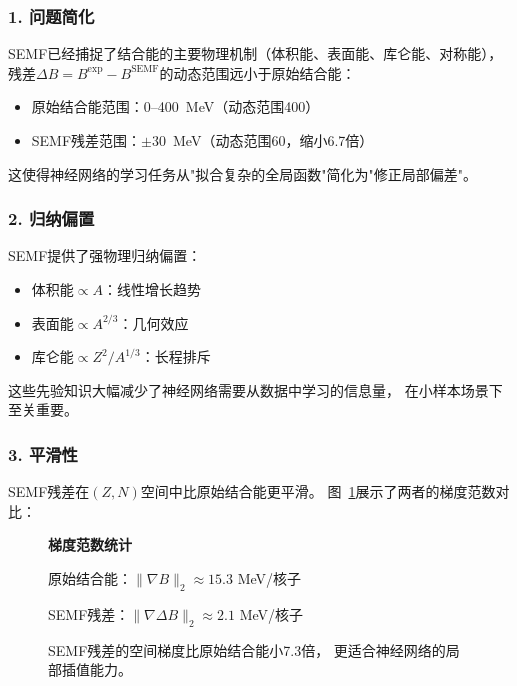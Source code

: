 \documentclass[12pt, a4paper]{article}
\begin{document}
\subsubsection{1. 问题简化}

SEMF已经捕捉了结合能的主要物理机制（体积能、表面能、库仑能、对称能），
残差$\Delta B = B^{\text{exp}} - B^{\text{SEMF}}$的动态范围远小于原始结合能：

\begin{itemize}
  \item 原始结合能范围：0--400~MeV（动态范围400）
  \item SEMF残差范围：$\pm 30$~MeV（动态范围60，缩小6.7倍）
\end{itemize}

这使得神经网络的学习任务从"拟合复杂的全局函数"简化为"修正局部偏差"。

\subsubsection{2. 归纳偏置}

SEMF提供了强物理归纳偏置：
\begin{itemize}
  \item 体积能$\propto A$：线性增长趋势
  \item 表面能$\propto A^{2/3}$：几何效应
  \item 库仑能$\propto Z^2/A^{1/3}$：长程排斥
\end{itemize}

这些先验知识大幅减少了神经网络需要从数据中学习的信息量，
在小样本场景下至关重要。

\subsubsection{3. 平滑性}

SEMF残差在$(Z, N)$空间中比原始结合能更平滑。
图~\ref{fig:smoothness}展示了两者的梯度范数对比：

\begin{figure}[htbp]
  \centering
  \textbf{梯度范数统计}

  \vspace{0.5em}
  原始结合能：$\|\nabla B\|_2 \approx 15.3$ MeV/核子

  SEMF残差：$\|\nabla \Delta B\|_2 \approx 2.1$ MeV/核子

  \vspace{0.5em}
  \caption{SEMF残差的空间梯度比原始结合能小7.3倍，
  更适合神经网络的局部插值能力。}
  \label{fig:smoothness}
\end{figure}
\end{document}
